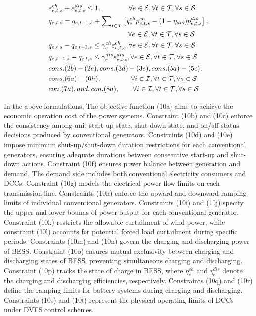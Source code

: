 \documentclass[lettersize,journal]{IEEEtran}
\begin{document}
\begin{subequations}
\begin{align}
    & \varepsilon_{e,t,s}^{ch}+ \varepsilon_{e,t,s}^{dis}\leq 1, \quad\quad\qquad \forall e\in\mathcal{E}, \forall t\in\mathcal{T}, \forall s\in\mathcal{S}\\
    & q_{e,t,s} = q_{e,t-1,s} + \sum\nolimits_{t\in\mathcal{T}} \left[\eta_{e}^{ch} p_{e,t,s}^{ch} - (1-\eta_{dis}) p_{e,t,s}^{dis}\right],\notag\\
    & \,\,\,\quad\qquad\qquad\qquad \qquad\qquad \forall e\in\mathcal{E}, \forall t\in\mathcal{T}, \forall s\in\mathcal{S}\\
    & q_{e,t,s} - q_{e,t-1,s} \leq \gamma_{e}^{ch} \varepsilon_{e,t,s}^{ch},\forall e\in\mathcal{E}, \forall t\in\mathcal{T}, \forall s\in\mathcal{S}\\
    & q_{e,t-1,s} - q_{e,t,s} \leq \gamma_{e}^{dis} \varepsilon_{e,t,s}^{dis},\forall e\in\mathcal{E}, \forall t\in\mathcal{T}, \forall s\in\mathcal{S}\\
    & cons.(2b)-(2e), cons.(3d)-(3e), cons.(5a)-(5c), \notag\\
    & cons.(6a)-(6h), \qquad\qquad\,\, \forall i\in\mathcal{I}, \forall t\in\mathcal{T}, \forall s\in\mathcal{S} \\
    & con.(7a), and, con.(8a), \quad\quad \forall i\in\mathcal{I}, \forall t\in\mathcal{T}, \forall s\in\mathcal{S}
\end{align}
\end{subequations}

In the above formulations,
The objective function (10a) aims to achieve the economic operation cost of the power systems.
Constraint (10b) and (10c) enforce the consistency among unit start-up state, shut-down state, and on/off status decisions produced by conventional generators.
Constraints (10d) and (10e) impose minimum shut-up/shut-down duration restrictions for each conventional generators, ensuring adequate durations between consecutive start-up and shut-down actions.
Constraint (10f) ensures power balance between generation and demand. The demand side includes both conventional electricity consumers and DCCs.
Constraint (10g) models the electrical power flow limits on each transmission line.
Constraints (10h) enforce the upward and downward ramping limits of individual conventional generators.
Constraints (10i) and (10j) specify the upper and lower bounds of power output for each conventional generator.
Constraint (10k) restricts the allowable curtailment of wind power, while constraint (10l) accounts for potential forced load curtailment during specific periods.
Constraints (10m) and (10n) govern the charging and discharging power of BESS.
Constraint (10o) ensures mutual exclusivity between charging and discharging states of BESS, preventing simultaneous charging and discharging.
Constraint (10p) tracks the state of charge in BESS, where $\eta_{e}^{ch}$ and $\eta_{e}^{dis}$ denote the charging and discharging efficiencies, respectively.
Constraints (10q) and (10r) define the ramping limits for battery systems during charging and discharging.
Constraints (10s) and (10t) represent the physical operating limits of DCCs under DVFS control schemes.
\end{document}

